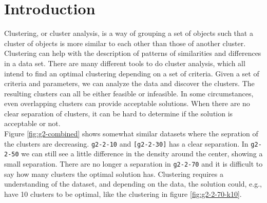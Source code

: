 \documentclass[a4paper,10pt]{article}
\theoremstyle{plain}
\theoremstyle{definition}
\begin{document}
\newpage
\section{Introduction}

Clustering, or cluster analysis, is a way of grouping a set of objects such that a cluster of objects is more similar to each other than those of another cluster. Clustering can help with the description of patterns of similarities and differences in a data set. There are many different tools to do cluster analysis, which all intend to find an optimal clustering depending on a set of criteria. Given a set of criteria and parameters, we can analyze the data and discover the clusters. The resulting clusters can all be either feasible or infeasible. In some circumstances, even overlapping clusters can provide acceptable solutions. When there are no clear separation of clusters, it can be hard to determine if the solution is acceptable or not.\\
Figure \ref{fig:g2-combined} shows somewhat similar datasets where the sepration of the clusters are decreasing. \texttt{g2-2-10} and \texttt{[g2-2-30]} has a clear separation. In \texttt{g2-2-50} we can still see a little difference in the density around the center, showing a small separation. There are no longer a separation in \texttt{g2-2-70} and it is difficult to say how many clusters the optimal solution has. Clustering requires a understanding of the dataset, and depending on the data, the solution could, e.g., have 10 clusters to be optimal, like the clustering in figure \ref{fig:g2-2-70-k10}.
\end{document}
